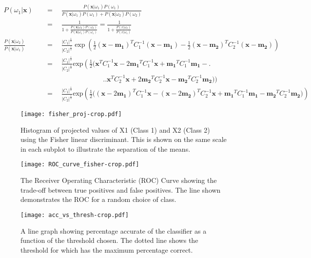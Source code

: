 \documentclass[a4paper,10pt]{article}
\begin{document}
\begin{align}
P(\omega_1|\mathbf{x}) \quad &= \quad \frac{P(\mathbf{x}|\omega_1)P(\omega_1)}{P(\mathbf{x}|\omega_1)P(\omega_1) + P(\mathbf{x}|\omega_2)P(\omega_2)}\\
\quad &= \quad \frac{1}{1+\frac{P(\mathbf{x}|\omega_2)P(\omega_2)}{P(\mathbf{x}|\omega_1)P(\omega_1)}} = \frac{1}{1 + \frac{P(x|\omega_2)}{P(x|\omega_1)}}\\
\frac{P(\mathbf{x}|\omega_2)}{P(\mathbf{x}|\omega_1)} \quad &= \quad \frac{|C_1|^{\frac{1}{2}}}{|C_2|^{\frac{1}{2}}}\exp\left(\frac{1}{2}(\mathbf{x}-\mathbf{m_1})^TC_{1}^{-1}(\mathbf{x} -\mathbf{m_1}) - \frac{1}{2}(\mathbf{x}-\mathbf{m_2})^TC_{2}^{-1}(\mathbf{x} -\mathbf{m_2})\right) \\
&= \quad \frac{|C_1|^ { \frac{1}{2} } } {|C_2|^ { \frac{1}{2} } }\text{exp}\left(\frac{1}{2} \Big(
\mathbf{x}^TC_{1}^{-1}\mathbf{x} - 2\mathbf{m_1}^TC_{1}^{-1}\mathbf{x} + \mathbf{m_1}^TC_{1}^{-1}\mathbf{m_1} - \Big.\right.\\
& \qquad\qquad\qquad\qquad~~ \bigg.\Big.\mathbf{x}^TC_{2}^{-1}\mathbf{x} + 2\mathbf{m_2}^TC_{2}^{-1}\mathbf{x} - \mathbf{m_2}^TC_{2}^{-1}\mathbf{m_2} \Big)\bigg)\\
&= \quad \frac{|C_1|^ { \frac{1}{2} } } {|C_2|^ { \frac{1}{2} } }\text{exp}\left(\frac{1}{2} \Big((\mathbf{x}-2\mathbf{m_1})^TC_{1}^{-1}\mathbf{x} - (\mathbf{x}-2\mathbf{m_2})^TC_{2}^{-1}\mathbf{x} + \mathbf{m_1}^{T}C_{1}^{-1}\mathbf{m_1} - \mathbf{m_2}^{T}C_{2}^{-1}\mathbf{m_2}\Big)\right)\label{eq:bayes_post}
\end{align}

\begin{figure}
    \centering
    \texttt{[image: fisher\_proj-crop.pdf]}
    \caption{Histogram of projected values of X1 (Class 1) and X2 (Class 2) using the Fisher linear discriminant. This is shown on the same scale in each subplot to illustrate the separation of the means.\label{fig:fisher_proj}}
\end{figure}

\begin{figure}
    \centering
    \texttt{[image: ROC\_curve\_fisher-crop.pdf]}
    \caption{The Receiver Operating Characteristic (ROC) Curve showing the trade-off between true positives and false positives. The line shown demonstrates the ROC for a random choice of class.\label{fig:ROC}}
\end{figure}

\begin{figure}
    \centering
    \texttt{[image: acc\_vs\_thresh-crop.pdf]}
    \caption{A line graph showing percentage accurate of the classifier as a function of the threshold chosen. The dotted line shows the threshold for which has the maximum percentage correct.\label{fig:thresh}}
\end{figure}
\end{document}

